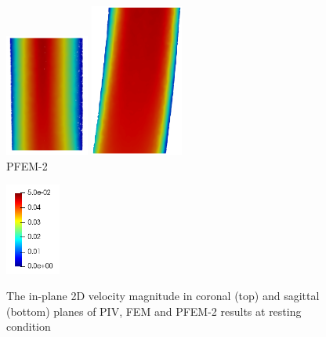 \begin{figure}
\begin{minipage}[c][10cm][c]{0.25\textwidth}
\end{minipage}
\begin{minipage}[c][10cm][c]{0.25\textwidth}
\centering
\vspace*{\fill}
\includegraphics[height=4cm]{imgs/vena_cava/PFEM_coronal_rest.png}
\includegraphics[height=5cm]{imgs/vena_cava/PFEM_sagittal_rest.png}
\\PFEM-2
\end{minipage}
\begin{minipage}[c][10cm][t]{0.1\textwidth}
\vspace*{\fill}
\centering
\includegraphics[height=3cm]{imgs/vena_cava/colormap_rest.png}
\\
\end{minipage}
\caption{The in-plane 2D velocity magnitude in coronal (top) and sagittal (bottom) planes of PIV, FEM and PFEM-2 results at resting condition}
\label{fig:rest}
\end{figure}

